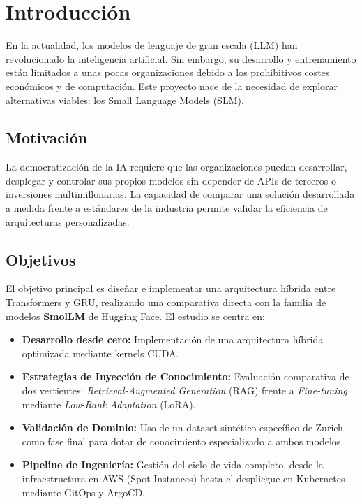\section{Introducción}
\label{sec:introduccion}

En la actualidad, los modelos de lenguaje de gran escala (LLM) han revolucionado la inteligencia artificial. Sin embargo, su desarrollo y entrenamiento están limitados a unas pocas organizaciones debido a los prohibitivos costes económicos y de computación. Este proyecto nace de la necesidad de explorar alternativas viables: los Small Language Models (SLM).

\subsection{Motivación}
La democratización de la IA requiere que las organizaciones puedan desarrollar, desplegar y controlar sus propios modelos sin depender de APIs de terceros o inversiones multimillonarias. La capacidad de comparar una solución desarrollada a medida frente a estándares de la industria permite validar la eficiencia de arquitecturas personalizadas.

\subsection{Objetivos}
El objetivo principal es diseñar e implementar una arquitectura híbrida entre Transformers y GRU, realizando una comparativa directa con la familia de modelos \textbf{SmolLM} de Hugging Face. El estudio se centra en:
\begin{itemize}
    \item \textbf{Desarrollo desde cero:} Implementación de una arquitectura híbrida optimizada mediante kernels CUDA.
    \item \textbf{Estrategias de Inyección de Conocimiento:} Evaluación comparativa de dos vertientes: \textit{Retrieval-Augmented Generation} (RAG) frente a \textit{Fine-tuning} mediante \textit{Low-Rank Adaptation} (LoRA).
    \item \textbf{Validación de Dominio:} Uso de un dataset sintético específico de Zurich como fase final para dotar de conocimiento especializado a ambos modelos.
    \item \textbf{Pipeline de Ingeniería:} Gestión del ciclo de vida completo, desde la infraestructura en AWS (Spot Instances) hasta el despliegue en Kubernetes mediante GitOps y ArgoCD.
\end{itemize}
